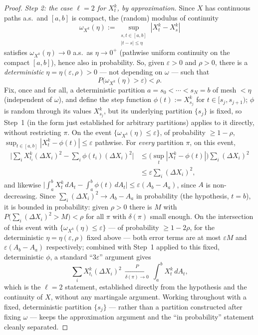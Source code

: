 \documentclass[11pt,fleqn]{article}
\newcommand{\eps}{\varepsilon}
\theoremstyle{plain}
\theoremstyle{remark}
\begin{document}
\begin{proof}
\medskip\noindent\textit{Step 2: the case $\ell=2$ for $X_t^k$, by
approximation.} Since $X$ has continuous paths a.s.\ and $[a,b]$ is
compact, the (random) modulus of continuity
\[
\omega_{X^k}(\eta):=\sup_{\substack{s,t\in[a,b]\\|t-s|\le\eta}}|X_t^k-X_s^k|
\]
satisfies $\omega_{X^k}(\eta)\to0$ a.s.\ as $\eta\to0^+$ (pathwise
uniform continuity on the compact $[a,b]$), hence also in probability.
So, given $\eps>0$ and $\rho>0$, there is a \emph{deterministic}
$\eta=\eta(\eps,\rho)>0$ --- not depending on $\omega$ --- such that
\[
P\big(\omega_{X^k}(\eta)>\eps\big)<\rho.
\]
Fix, once and for all, a deterministic partition $a=s_0<\cdots<s_N=b$ of
mesh $<\eta$ (independent of $\omega$), and define the step function
$\phi(t):=X_{s_j}^k$ for $t\in[s_j,s_{j+1})$; $\phi$ is random through
its values $X_{s_j}^k$, but its underlying partition $\{s_j\}$ is fixed,
so Step~1 (in the form just established for arbitrary partitions)
applies to it directly, without restricting $\pi$. On the event
$\{\omega_{X^k}(\eta)\le\eps\}$, of probability $\ge1-\rho$,
$\sup_{t\in[a,b]}|X_t^k-\phi(t)|\le\eps$ pathwise. For \emph{every}
partition $\pi$, on this event,
\begin{align*}
\Big|\sum_iX_{t_i}^k(\Delta X_i)^2-\sum_i\phi(t_i)(\Delta X_i)^2\Big|
&\le\Big(\sup_t|X_t^k-\phi(t)|\Big)\sum_i(\Delta X_i)^2\\
&\le\eps\sum_i(\Delta X_i)^2,
\end{align*}
and likewise $\big|\int_a^bX_t^k\,dA_t-\int_a^b\phi(t)\,dA_t\big|
\le\eps(A_b-A_a)$, since $A$ is non-decreasing. Since $\sum_i(\Delta
X_i)^2\to A_b-A_a$ in probability (the hypothesis, $t=b$), it is bounded
in probability: given $\rho>0$ there is $M$ with
$P\big(\sum_i(\Delta X_i)^2>M\big)<\rho$ for all $\pi$ with $\delta(\pi)$
small enough. On the intersection of this event with
$\{\omega_{X^k}(\eta)\le\eps\}$ --- of probability $\ge1-2\rho$, for the
deterministic $\eta=\eta(\eps,\rho)$ fixed above --- both error terms are
at most $\eps M$ and $\eps(A_b-A_a)$ respectively; combined with Step~1
applied to this fixed, deterministic $\phi$, a standard ``$3\eps$''
argument gives
\[
\sum_iX_{t_i}^k(\Delta X_i)^2\ \xrightarrow[\delta(\pi)\to0]{P}\ \int_a^bX_t^k\,dA_t,
\]
which is the $\ell=2$ statement, established directly from the hypothesis
and the continuity of $X$, without any martingale argument. Working
throughout with a fixed, deterministic partition $\{s_j\}$ --- rather
than a partition constructed after fixing $\omega$ --- keeps the
approximation argument and the ``in probability'' statement cleanly
separated.


\end{proof}
\end{document}

